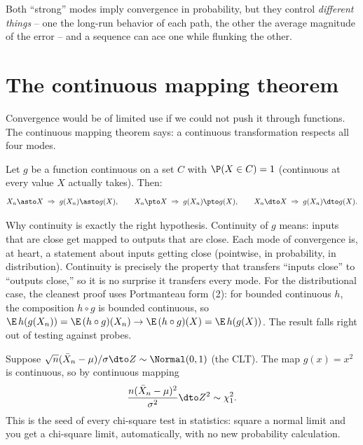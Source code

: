 Both ``strong'' modes imply convergence in probability, but they control \emph{different
things} -- one the long-run behavior of each path, the other the average magnitude of
the error -- and a sequence can ace one while flunking the other.

\section{The continuous mapping theorem}
\label{ch22:cmt}

Convergence would be of limited use if we could not push it through functions. The
continuous mapping theorem says: a continuous transformation respects all four modes.

\begin{theorem}
\label{ch22:thm-cmt}
Let $g$ be a function continuous on a set $C$ with $\P(X\in C)=1$ (continuous at every
value $X$ actually takes). Then:
\[
  X_n\asto X \;\Rightarrow\; g(X_n)\asto g(X),\qquad
  X_n\pto X \;\Rightarrow\; g(X_n)\pto g(X),\qquad
  X_n\dto X \;\Rightarrow\; g(X_n)\dto g(X).
\]
\end{theorem}

\begin{whybox}
Why continuity is exactly the right hypothesis. Continuity of $g$ means: inputs that
are close get mapped to outputs that are close. Each mode of convergence is, at heart,
a statement about inputs getting close (pointwise, in probability, in distribution).
Continuity is precisely the property that transfers ``inputs close'' to ``outputs
close,'' so it is no surprise it transfers every mode. For the distributional case,
the cleanest proof uses Portmanteau form (2): for bounded continuous $h$, the
composition $h\circ g$ is bounded continuous, so $\E\,h(g(X_n))=\E\,(h\circ g)(X_n)\to
\E\,(h\circ g)(X)=\E\,h(g(X))$. The result falls right out of testing against probes.
\end{whybox}

\begin{example}
\label{ch22:ex-chisq}
Suppose $\sqrt n(\bar X_n - \mu)/\sigma \dto Z\sim\Normal(0,1)$ (the CLT). The map
$g(x)=x^2$ is continuous, so by continuous mapping
\[
  \frac{n(\bar X_n - \mu)^2}{\sigma^2} \dto Z^2 \sim \chi^2_1.
\]
This is the seed of every chi-square test in statistics: square a normal limit and you
get a chi-square limit, automatically, with no new probability calculation.
\end{example}

